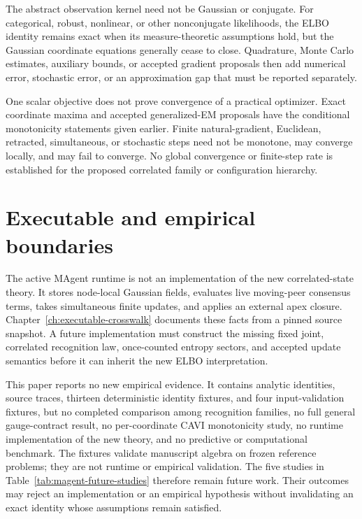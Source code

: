 The abstract observation kernel need not be Gaussian or conjugate. For categorical, robust, nonlinear, or other nonconjugate likelihoods, the ELBO identity remains exact when its measure-theoretic assumptions hold, but the Gaussian coordinate equations generally cease to close. Quadrature, Monte Carlo estimates, auxiliary bounds, or accepted gradient proposals then add numerical error, stochastic error, or an approximation gap that must be reported separately.

One scalar objective does not prove convergence of a practical optimizer. Exact coordinate maxima and accepted generalized-EM proposals have the conditional monotonicity statements given earlier. Finite natural-gradient, Euclidean, retracted, simultaneous, or stochastic steps need not be monotone, may converge locally, and may fail to converge. No global convergence or finite-step rate is established for the proposed correlated family or configuration hierarchy.

\section{Executable and empirical boundaries}

The active MAgent runtime is not an implementation of the new correlated-state theory. It stores node-local Gaussian fields, evaluates live moving-peer consensus terms, takes simultaneous finite updates, and applies an external apex closure. Chapter~\ref{ch:executable-crosswalk} documents these facts from a pinned source snapshot. A future implementation must construct the missing fixed joint, correlated recognition law, once-counted entropy sectors, and accepted update semantics before it can inherit the new ELBO interpretation.

This paper reports no new empirical evidence. It contains analytic identities, source traces, thirteen deterministic identity fixtures, and four input-validation fixtures, but no completed comparison among recognition families, no full general gauge-contract result, no per-coordinate CAVI monotonicity study, no runtime implementation of the new theory, and no predictive or computational benchmark. The fixtures validate manuscript algebra on frozen reference problems; they are not runtime or empirical validation. The five studies in Table~\ref{tab:magent-future-studies} therefore remain future work. Their outcomes may reject an implementation or an empirical hypothesis without invalidating an exact identity whose assumptions remain satisfied.


